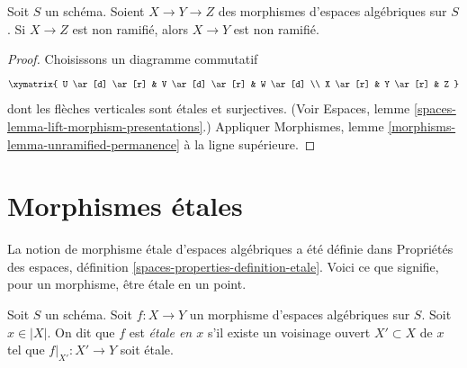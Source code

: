 \begin{lemma}
\label{lemma-permanence-unramified}
Soit $S$ un schéma.
Soient $X \to Y \to Z$ des morphismes d'espaces algébriques sur $S$.
Si $X \to Z$ est non ramifié, alors $X \to Y$ est non ramifié.
\end{lemma}

\begin{proof}
Choisissons un diagramme commutatif
$$
\xymatrix{
U \ar[d] \ar[r] & V \ar[d] \ar[r] & W \ar[d] \\
X \ar[r] & Y \ar[r] & Z
}
$$
dont les flèches verticales sont étales et surjectives. (Voir
Espaces, lemme \ref{spaces-lemma-lift-morphism-presentations}.)
Appliquer
Morphismes, lemme \ref{morphisms-lemma-unramified-permanence}
à la ligne supérieure.
\end{proof}














\section{Morphismes étales}
\label{section-etale}

\noindent
La notion de morphisme étale d'espaces algébriques a été définie dans
Propriétés des espaces, définition \ref{spaces-properties-definition-etale}.
Voici ce que signifie, pour un morphisme, être étale en un point.

\begin{definition}
\label{definition-etale}
Soit $S$ un schéma.
Soit $f : X \to Y$ un morphisme d'espaces algébriques sur $S$.
Soit $x \in |X|$. On dit que $f$ est {\it étale en $x$} s'il
existe un voisinage ouvert $X' \subset X$ de $x$ tel que
$f|_{X'} : X' \to Y$ soit étale.
\end{definition}

